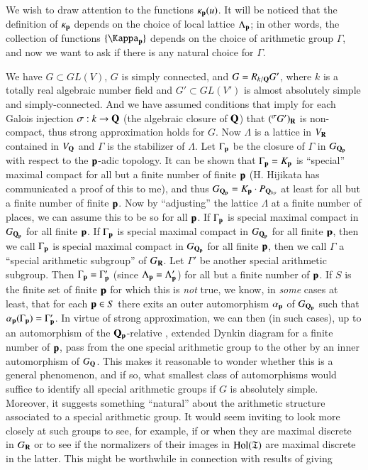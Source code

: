 We wish to draw attention to the functions $\kappa_{\mathbf{p}} (u)$. It will be noticed that the definition of $\kappa_{\mathbf{p}}$ depends on the choice of local lattice $\Lambda_{\mathbf{p}}$; in other words, the collection of functions $\{\Kappa_{\bp}\}$ depends on the choice of arithmetic group $\Gamma$, and now we want to ask if there is any natural choice for $\Gamma$.

We have $G \subset G L (V)$, $G$ is simply connected, and $G = R_{k/\mathbf{Q}} G'$, where $k$ is a totally real algebraic number field and $G' \subset G L (V')$ is almost absolutely simple and simply-connected. And we have assumed conditions that imply for each Galois injection $\sigma : k \to \mathbf{Q}$ (the algebraic closure of $\mathbf{Q}$) that $({}^{\sigma} G')_{\mathbf{R}}$ is non-compact, thus strong approximation holds for $G$. Now $\Lambda$ is a lattice in $V_{\mathbf{R}}$ contained in $V_{\mathbf{Q}}$ and $\Gamma$ is the stabilizer of $\Lambda$. Let $\Gamma_{\mathbf{p}}$ be the closure of $\Gamma$ in $G_{\mathbf{Q}_{\mathbf{p}}}$ with respect to the $\mathbf{p}$-adic topology. It can be shown that $\Gamma_{\mathbf{p}}= K_{\mathbf{p}}$ is ``special'' maximal compact \cite{art1-key5,art1-key9} for all but a finite number of finite $\mathbf{p}$ (H. Hijikata has communicated a proof of this to me), and thus $G_{\mathbf{Q}_{\mathbf{p}}} = K_{\mathbf{p}} \cdot P_{\mathbf{Q}_{bp}}$ at least for all but a finite number of finite $\mathbf{p}$. Now by ``adjusting'' the lattice $\Lambda$ at a finite number of places, we can assume this to be so for all $\mathbf{p}$. If $\Gamma_{\mathbf{p}}$ is special maximal compact in $G_{\mathbf{Q}_{\mathbf{p}}}$ for all finite $\mathbf{p}$. If $\Gamma_{\mathbf{p}}$ is special maximal compact in $G_{\mathbf{Q}_{\mathbf{p}}}$ for all finite $\mathbf{p}$, then we call $\Gamma_{\mathbf{p}}$ is special maximal compact in $G_{\mathbf{Q}_{\mathbf{p}}}$ for all finite $\mathbf{p}$, then we call $\Gamma$ a ``special arithmetic subgroup'' of $G_{\mathbf{R}}$. Let $\Gamma'$ be another special arithmetic subgroup. Then $\Gamma_{\mathbf{p}}=\Gamma'_{\mathbf{p}}$ (since $\Lambda_{\mathbf{p}} = \Lambda'_{\mathbf{p}}$) for all but a finite number of $\mathbf{p}$. If $S$ is the finite set of finite $\mathbf{p}$ for which this is {\it not} true, we know, in {\it some} cases at least, that for each $\mathbf{p} \in S$ there exits an outer automorphism $\alpha_{\mathbf{p}}$ of $G_{\mathbf{Q}_{\mathbf{p}}}$ such that $\alpha_{\mathbf{p}} (\Gamma_{\mathbf{p}}) = \Gamma'_{\mathbf{p}}$. In virtue of strong approximation, we can then (in such cases), up to an automorphism of the $\mathbf{Q}_{\mathbf{p}}$-relative , extended Dynkin diagram for a finite number of $\mathbf{p}$, pass from the one special arithmetic group to the other by an inner automorphism of $G_{\mathbf{Q}}$. This makes it reasonable to wonder whether this is a general phenomenon, and if so, what smallest class of automorphisms would suffice to identify all special arithmetic groups if $G$ is absolutely simple. Moreover, it suggests something ``natural'' about the arithmetic structure associated to a special arithmetic group. It would seem inviting to look more closely at such groups to see, for example, if or when they are maximal discrete in $G_{\mathbf{R}}$ or to see if the normalizers of their images in $\operatorname{Hol}(\mathfrak{T})$ are maximal discrete in the latter. This might be worthwhile in connection with results of \cite{art1-key1} giving\pageoriginale








\vfill\eject

~\phantom{A}
\thispagestyle{empty}


